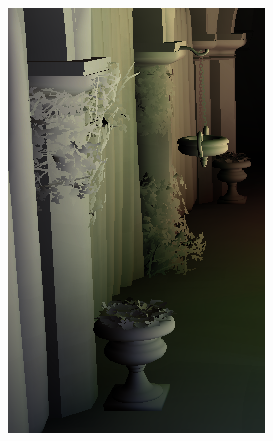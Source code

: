 \begin{figure}[htb]
\begin{subfigure}[b]{0.20\textwidth}
        \includegraphics[width=.95\textwidth]{screenshots/interleaved_without}
        \caption{}
        \label{fig:results:interleaved_without}
    \end{subfigure}%
    \begin{subfigure}[b]{0.20\textwidth}
        \centering

\end{subfigure}
\end{figure}
